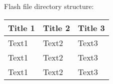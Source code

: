 Flash file directory structure:

\begin{table}[h!]
\begin{center}
\begin{tabular}{|p{1.25in}|p{2in}|p{3.25in}|}

\hline
{\bf Title 1} &	{\bf Title 2} &	{\bf Title 3}\\

\hline
\rule{0pt}{3ex}
Text1	&Text2	&	Text3\\ 

\hline
\rule{0pt}{3ex}
Text1	&Text2	&	Text3\\ 

\hline
\rule{0pt}{3ex}
Text1	&Text2	&	Text3\\ 

\hline
\end{tabular}
\end{center}
\label{label}
\end{table}
